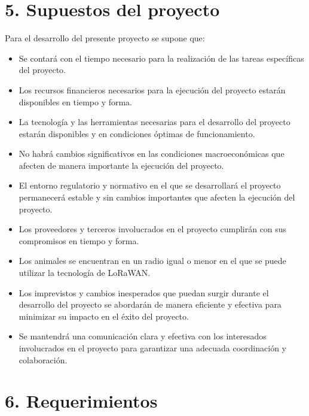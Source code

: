 \documentclass[
11pt, %
]{charter}
\begin{document}
\section{5. Supuestos del proyecto}
\label{sec:supuestos}

Para el desarrollo del presente proyecto se supone que:

\begin{itemize}
	\item Se contará con el tiempo necesario para la realización de las tareas específicas del proyecto.
	\item Los recursos financieros necesarios para la ejecución del proyecto estarán disponibles en tiempo y forma.
	\item La tecnología y las herramientas necesarias para el desarrollo del proyecto estarán disponibles y en condiciones óptimas de funcionamiento.
	\item No habrá cambios significativos en las condiciones macroeconómicas que afecten de manera importante la ejecución del proyecto.
	\item El entorno regulatorio y normativo en el que se desarrollará el proyecto permanecerá estable y sin cambios importantes que afecten la ejecución del proyecto.
	\item Los proveedores y terceros involucrados en el proyecto cumplirán con sus compromisos en tiempo y forma.
	\item Los animales se encuentran en un radio igual o menor en el que se puede utilizar la tecnología de LoRaWAN. 
	\item Los imprevistos y cambios inesperados que puedan surgir durante el desarrollo del proyecto se abordarán de manera eficiente y efectiva para minimizar su impacto en el éxito del proyecto.
	\item Se mantendrá una comunicación clara y efectiva con los interesados involucrados en el proyecto para garantizar una adecuada coordinación y colaboración.
\end{itemize}


\section{6. Requerimientos}
\label{sec:requerimientos}
\end{document}
